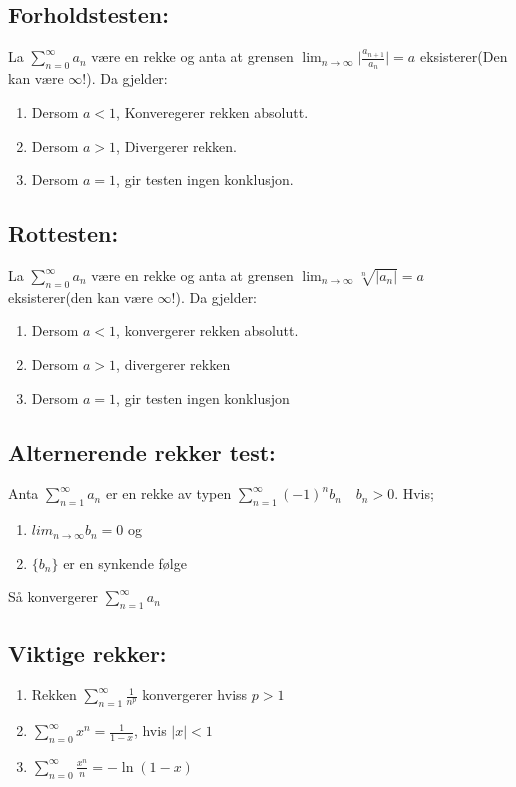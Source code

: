 \documentclass[12pt,a4paper,twocolumn,twoside]{article}
\def\abs#1{\lvert #1 \rvert}
\def\suminfty#1#2{\sum_{n=#1}^\infty #2}
\begin{document}
        \subsection*{Forholdstesten:}
        La $\suminfty{0}{a_n}$ være en rekke og anta at grensen $\lim_{n\to\infty}\abs{\frac{a_{n+1}}{a_n}}=a$ eksisterer(Den kan være $\infty$!). Da gjelder:
        \begin{enumerate}
            \item Dersom $a<1$, Konveregerer rekken absolutt.
            \item Dersom $a>1$, Divergerer rekken.
            \item Dersom $a=1$, gir testen ingen konklusjon.
        \end{enumerate}
        \subsection*{Rottesten:}
        La $\suminfty{0}{a_n}$ være en rekke og anta at grensen $\lim_{n\to\infty}\sqrt[n]{\abs{a_n}}=a$ eksisterer(den kan være $\infty$!). Da gjelder:
        \begin{enumerate}
            \item Dersom $a<1$, konvergerer rekken absolutt.
            \item Dersom $a>1$, divergerer rekken
            \item Dersom $a=1$, gir testen ingen konklusjon
        \end{enumerate}
        \subsection*{Alternerende rekker test:}
        Anta $\suminfty{1}{a_n}$ er en rekke av typen $\suminfty{1}{(-1)^n b_n}\quad b_n>0$. Hvis;
        \begin{enumerate}
            \item $lim_{n\to\infty}b_n=0$ og
            \item $\{b_n\}$ er en synkende følge
        \end{enumerate}
        Så konvergerer $\suminfty{1}{a_n}$
        \subsection*{Viktige rekker:}
        \begin{enumerate}
            \item Rekken $\sum_{n=1}^\infty \frac{1}{n^p}$ konvergerer hviss $p > 1$ 
            \item $\suminfty{0}{x^n}=\frac{1}{1-x}$, hvis $\abs{x}<1$
            \item $\suminfty{0}{\frac{x^n}{n}} =-\ln(1-x)$
        \end{enumerate}
\end{document}
